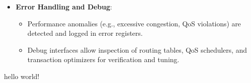\documentclass[11pt,a4paper]{article}
\begin{document}
\begin{itemize}
\begin{itemize}
    \end{itemize}
    \item \textbf{Error Handling and Debug}:
    \begin{itemize}
        \item Performance anomalies (e.g., excessive congestion, QoS violations) are detected and logged in error registers.
        \item Debug interfaces allow inspection of routing tables, QoS schedulers, and transaction optimizers for verification and tuning.
    \end{itemize}
\end{itemize}
	hello world!
	
\end{document}
